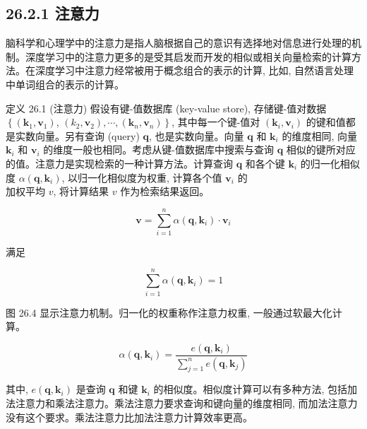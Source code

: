 \documentclass[10pt]{article}
\begin{document}
\subsection*{26.2.1 注意力}
脑科学和心理学中的注意力是指人脑根据自己的意识有选择地对信息进行处理的机制。深度学习中的注意力更多的是受其启发而开发的相似或相关向量检索的计算方法。在深度学习中注意力经常被用于概念组合的表示的计算, 比如, 自然语言处理中单词组合的表示的计算。

定义 26.1 (注意力) 假设有键-值数据库 (key-value store), 存储键-值对数据 $\left\{\left(\boldsymbol{k}_{1}, \boldsymbol{v}_{1}\right)\right.$, $\left.\left(k_{2}, \boldsymbol{v}_{2}\right), \cdots,\left(\boldsymbol{k}_{n}, \boldsymbol{v}_{n}\right)\right\}$, 其中每一个键-值对 $\left(\boldsymbol{k}_{i}, \boldsymbol{v}_{i}\right)$ 的键和值都是实数向量。另有查询 (query) $\boldsymbol{q}$, 也是实数向量。向量 $\boldsymbol{q}$ 和 $\boldsymbol{k}_{i}$ 的维度相同, 向量 $\boldsymbol{k}_{i}$ 和 $\boldsymbol{v}_{i}$ 的维度一般也相同。考虑从键-值数据库中搜索与查询 $\boldsymbol{q}$ 相似的键所对应的值。注意力是实现检索的一种计算方法。计算查询 $\boldsymbol{q}$ 和各个键 $\boldsymbol{k}_{i}$ 的归一化相似度 $\alpha\left(\boldsymbol{q}, \boldsymbol{k}_{i}\right)$, 以归一化相似度为权重, 计算各个值 $\boldsymbol{v}_{i}$ 的\\
加权平均 $v$, 将计算结果 $v$ 作为检索结果返回。


\begin{equation*}
\boldsymbol{v}=\sum_{i=1}^{n} \alpha\left(\boldsymbol{q}, \boldsymbol{k}_{i}\right) \cdot \boldsymbol{v}_{i} \tag{26.8}
\end{equation*}


满足

$$
\sum_{i=1}^{n} \alpha\left(\boldsymbol{q}, \boldsymbol{k}_{i}\right)=1
$$

图 26.4 显示注意力机制。归一化的权重称作注意力权重, 一般通过软最大化计算。


\begin{equation*}
\alpha\left(\boldsymbol{q}, \boldsymbol{k}_{i}\right)=\frac{e\left(\boldsymbol{q}, \boldsymbol{k}_{i}\right)}{\sum_{j=1}^{n} e\left(\boldsymbol{q}, \boldsymbol{k}_{j}\right)} \tag{26.9}
\end{equation*}


其中, $e\left(\boldsymbol{q}, \boldsymbol{k}_{i}\right)$ 是查询 $\boldsymbol{q}$ 和键 $\boldsymbol{k}_{i}$ 的相似度。相似度计算可以有多种方法, 包括加法注意力和乘法注意力。乘法注意力要求查询和键向量的维度相同, 而加法注意力没有这个要求。乘法注意力比加法注意力计算效率更高。
\end{document}
